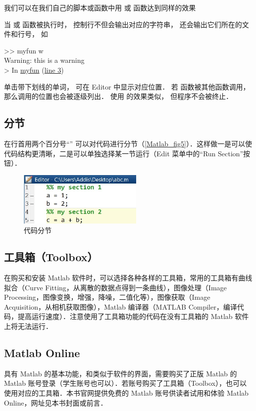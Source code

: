 我们可以在我们自己的脚本或函数中用  或  函数达到同样的效果

当  或  函数被执行时， 控制行不但会输出对应的字符串， 还会输出它们所在的文件和行号， 如
\begin{Command}
>> myfun w\\
{\color{warning}Warning: this is a warning\\
> In \underline{myfun} (\underline{line 3})}
\end{Command}
单击带下划线的单词， 可在 Editor 中显示对应位置． 若  函数被其他函数调用， 那么调用的位置也会被逐级列出． 使用  的效果类似， 但程序不会被终止．

\subsection{分节}
在行首用两个百分号“\x{\%\%}” 可以对代码进行分节（\autoref{Matlab_fig5}）．这样做一是可以使代码结构更清晰，二是可以单独选择某一节运行（Edit 菜单中的“Run Section”按钮）．
\begin{figure}[ht]
\centering
\includegraphics[width= 6cm]{./figures/Matlab5.pdf}
\caption{代码分节}\label{Matlab_fig5}
\end{figure}

\subsection{工具箱（Toolbox）}
在购买和安装 Matlab 软件时，可以选择各种各样的工具箱，常用的工具箱有曲线拟合（Curve Fitting，从离散的数据点得到一条曲线），图像处理（Image Processing，图像变换，增强，降噪，二值化等），图像获取（Image Acquisition，从相机获取图像），Matlab 编译器（MATLAB Compiler，编译代码，提高运行速度）．注意使用了工具箱功能的代码在没有工具箱的 Matlab 软件上将无法运行．

\subsection{Matlab Online}
具有 Matlab 的基本功能，和类似于软件的界面，需要购买了正版 Matlab 的 Matlab 账号登录（学生账号也可以）．若账号购买了工具箱（Toolbox），也可以使用对应的工具箱．本书官网提供免费的 Matlab 账号供读者试用和体验 Matlab Online，网址见本书封面或前言．



